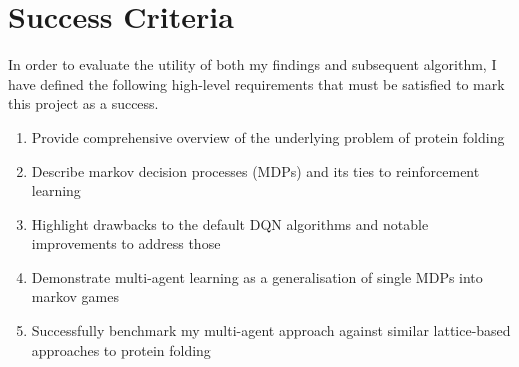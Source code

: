 \section{Success Criteria}
   In order to evaluate the utility of both my findings and subsequent algorithm,
   I have defined the following high-level requirements that must be satisfied to 
   mark this project as a success.
   \begin{enumerate}
      \item Provide comprehensive overview of the underlying problem of protein folding
      \item Describe markov decision processes (MDPs) and its ties to reinforcement learning
      \item Highlight drawbacks to the default DQN algorithms and notable improvements to address those
      \item Demonstrate multi-agent learning as a generalisation of single MDPs into markov games
      \item Successfully benchmark my multi-agent approach against similar lattice-based approaches to protein folding
   \end{enumerate}

